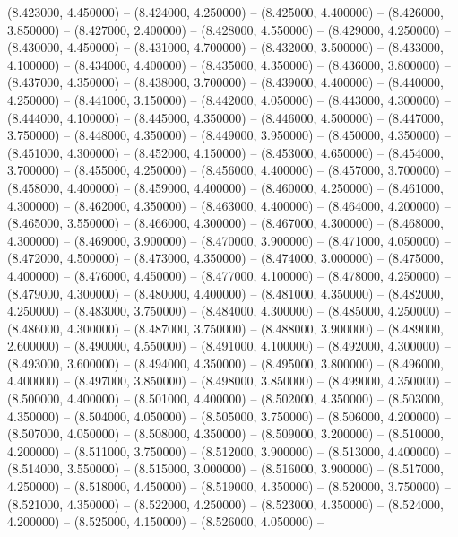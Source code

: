 (8.423000, 4.450000) -- 
(8.424000, 4.250000) -- 
(8.425000, 4.400000) -- 
(8.426000, 3.850000) -- 
(8.427000, 2.400000) -- 
(8.428000, 4.550000) -- 
(8.429000, 4.250000) -- 
(8.430000, 4.450000) -- 
(8.431000, 4.700000) -- 
(8.432000, 3.500000) -- 
(8.433000, 4.100000) -- 
(8.434000, 4.400000) -- 
(8.435000, 4.350000) -- 
(8.436000, 3.800000) -- 
(8.437000, 4.350000) -- 
(8.438000, 3.700000) -- 
(8.439000, 4.400000) -- 
(8.440000, 4.250000) -- 
(8.441000, 3.150000) -- 
(8.442000, 4.050000) -- 
(8.443000, 4.300000) -- 
(8.444000, 4.100000) -- 
(8.445000, 4.350000) -- 
(8.446000, 4.500000) -- 
(8.447000, 3.750000) -- 
(8.448000, 4.350000) -- 
(8.449000, 3.950000) -- 
(8.450000, 4.350000) -- 
(8.451000, 4.300000) -- 
(8.452000, 4.150000) -- 
(8.453000, 4.650000) -- 
(8.454000, 3.700000) -- 
(8.455000, 4.250000) -- 
(8.456000, 4.400000) -- 
(8.457000, 3.700000) -- 
(8.458000, 4.400000) -- 
(8.459000, 4.400000) -- 
(8.460000, 4.250000) -- 
(8.461000, 4.300000) -- 
(8.462000, 4.350000) -- 
(8.463000, 4.400000) -- 
(8.464000, 4.200000) -- 
(8.465000, 3.550000) -- 
(8.466000, 4.300000) -- 
(8.467000, 4.300000) -- 
(8.468000, 4.300000) -- 
(8.469000, 3.900000) -- 
(8.470000, 3.900000) -- 
(8.471000, 4.050000) -- 
(8.472000, 4.500000) -- 
(8.473000, 4.350000) -- 
(8.474000, 3.000000) -- 
(8.475000, 4.400000) -- 
(8.476000, 4.450000) -- 
(8.477000, 4.100000) -- 
(8.478000, 4.250000) -- 
(8.479000, 4.300000) -- 
(8.480000, 4.400000) -- 
(8.481000, 4.350000) -- 
(8.482000, 4.250000) -- 
(8.483000, 3.750000) -- 
(8.484000, 4.300000) -- 
(8.485000, 4.250000) -- 
(8.486000, 4.300000) -- 
(8.487000, 3.750000) -- 
(8.488000, 3.900000) -- 
(8.489000, 2.600000) -- 
(8.490000, 4.550000) -- 
(8.491000, 4.100000) -- 
(8.492000, 4.300000) -- 
(8.493000, 3.600000) -- 
(8.494000, 4.350000) -- 
(8.495000, 3.800000) -- 
(8.496000, 4.400000) -- 
(8.497000, 3.850000) -- 
(8.498000, 3.850000) -- 
(8.499000, 4.350000) -- 
(8.500000, 4.400000) -- 
(8.501000, 4.400000) -- 
(8.502000, 4.350000) -- 
(8.503000, 4.350000) -- 
(8.504000, 4.050000) -- 
(8.505000, 3.750000) -- 
(8.506000, 4.200000) -- 
(8.507000, 4.050000) -- 
(8.508000, 4.350000) -- 
(8.509000, 3.200000) -- 
(8.510000, 4.200000) -- 
(8.511000, 3.750000) -- 
(8.512000, 3.900000) -- 
(8.513000, 4.400000) -- 
(8.514000, 3.550000) -- 
(8.515000, 3.000000) -- 
(8.516000, 3.900000) -- 
(8.517000, 4.250000) -- 
(8.518000, 4.450000) -- 
(8.519000, 4.350000) -- 
(8.520000, 3.750000) -- 
(8.521000, 4.350000) -- 
(8.522000, 4.250000) -- 
(8.523000, 4.350000) -- 
(8.524000, 4.200000) -- 
(8.525000, 4.150000) -- 
(8.526000, 4.050000) -- 
